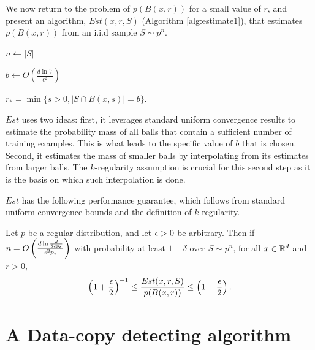 We now return to the problem of $p(B(x, r))$ for a small value of $r$, and present an algorithm, $Est(x, r, S)$ (Algorithm \ref{alg:estimate1}), that estimates $p(B(x, r))$ from an i.i.d sample $S \sim p^n$.

\begin{algorithm}
   \caption{$Est(x, r, S)$}
   \label{alg:estimate1}

   \DontPrintSemicolon
   
	$n \leftarrow |S|$\;
	
   $b \leftarrow O\left(\frac{d \ln \frac{n}{\delta}}{\epsilon^2} \right)$\;
   
   $r_* = \min \{s > 0, |S \cap B(x, s)| = b\}$.\;
   

\end{algorithm}

$Est$ uses two ideas: first, it leverages standard uniform convergence results to estimate the probability mass of all balls that contain a sufficient number of training examples. This is what leads to the specific value of $b$ that is chosen. Second, it estimates the mass of smaller balls by interpolating from its estimates from larger balls. The $k$-regularity assumption is crucial for this second step as it is the basis on which such interpolation is done. 

$Est$ has the following performance guarantee, which follows from standard uniform convergence bounds and the definition of $k$-regularity. 
\begin{proposition}\label{prop:est_works}
Let $p$ be a regular distribution, and let $\epsilon >0$ be arbitrary. Then if $n = O\left(\frac{d\ln\frac{d}{\delta \epsilon p_\epsilon}}{\epsilon^2 p_\epsilon}\right)$ with probability at least $1 - \delta$ over $S \sim p^n$, for all $x \in \mathbb{R}^d$ and $r > 0$, $$\left(1+\frac{\epsilon}{2}\right)^{-1}\leq \frac{Est(x, r, S)}{p(B(x, r))} \leq \left(1+\frac{\epsilon}{2}\right).$$
\end{proposition}

\section{A Data-copy detecting algorithm}

